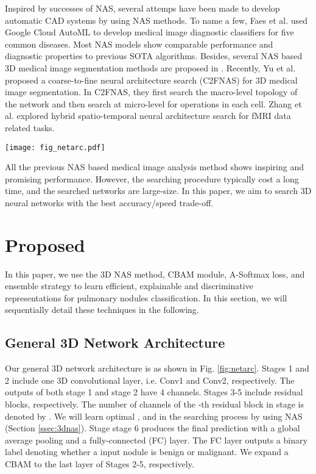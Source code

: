 \documentclass[final,5p,times,twocolumn]{elsarticle}
\begin{document}
Inspired by successes of NAS, several attemps have been made to develop automatic CAD systems by using NAS methods. To name a few, Faes et al. \cite{FAES2019AutoDLmedical} used Google Cloud AutoML to develop medical image diagnostic classifiers for five common diseases. Most NAS models show comparable performance and diagnostic properties to previous SOTA algorithms. Besides, several NAS based 3D medical image segmentation methods are proposed in \cite{kim2019scalable, weng2019nasunet}. Recently, Yu et al. \cite{yu2020c2fnas} proposed a coarse-to-fine neural architecture search (C2FNAS) for 3D medical image segmentation. In C2FNAS, they first search the macro-level topology of the network and then search at micro-level for operations in each cell. Zhang et al. \cite{zhang2019identify} explored hybrid spatio-temporal neural architecture search for fMRI data related tasks. 




\begin{figure*}
\centering
\texttt{[image: fig\_netarc.pdf]} \\
\caption{General 3D network architecture. Here, ,  and  are learned in the NAS algorithm.}
\label{fig:netarc}
\end{figure*}

All the previous NAS based medical image analysis method shows inspiring and promising performance. However, the searching procedure typically cost a long time, and the searched networks are large-size. In this paper, we aim to search 3D neural networks with the best accuracy/speed trade-off. 



\section{Proposed}
\label{sec:method}
In this paper, we use the 3D NAS method, CBAM module, A-Softmax loss, and ensemble strategy to learn efficient, explainable and discriminative representations for pulmonary nodules classification.  
In this section, we will sequentially detail these techniques in the following.



\subsection{General 3D Network Architecture}
\label{ssec:netarc}
Our general 3D network architecture is as shown in Fig. \ref{fig:netarc}. 
Stages 1 and 2 include one 3D convolutional layer, i.e. Conv1 and Conv2, respectively. The outputs  of both stage 1 and stage 2 have 4 channels. 
Stages 3-5 include  residual blocks, respectively. The number of channels of the -th residual block in stage  is denoted by . We will learn optimal , and  in the searching process by using NAS (Section \ref{ssec:3dnas}). 
Stage stage 6 produces the final prediction with a global average pooling and a fully-connected (FC) layer. The FC layer outputs a binary label denoting whether a input nodule is benign or malignant.
We expand a CBAM \citep{Woo2018CBAM} to the last layer of Stages 2-5, respectively. 
\end{document}
